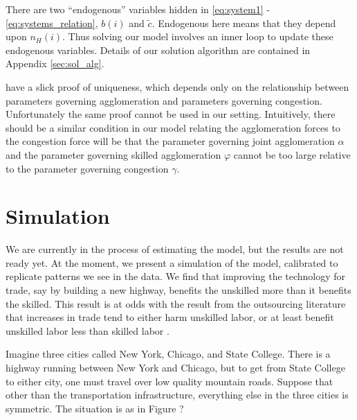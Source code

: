 \documentclass[12 pt]{article}
\begin{document}
There are two ``endogenous'' variables hidden in \eqref{eq:system1} - \eqref{eq:systems_relation}, $b(i)$ and $\tilde{c}$. Endogenous here means that they depend upon $n_H(i)$.  Thus solving our model involves an inner loop to update these endogenous variables.  Details of our solution algorithm are contained in Appendix \ref{sec:sol_alg}.

\citet{allen2014trade} have a slick proof of uniqueness, which depends only on the relationship between parameters governing agglomeration and parameters governing congestion.  Unfortunately the same proof cannot be used in our setting.  Intuitively, there should be a similar condition in our model relating the agglomeration forces to the congestion force will be that the parameter governing joint agglomeration $\alpha$ and the parameter governing skilled agglomeration $\varphi$ cannot be too large relative to the parameter governing congestion $\gamma$.  

\section{Simulation}

We are currently in the process of estimating the model, but the results are not ready yet.  At the moment, we present a simulation of the model, calibrated to replicate patterns we see in the data.  We find that improving the technology for trade, say by building a new highway, benefits the unskilled more than it benefits the skilled.  This result is at odds with the result from the outsourcing literature that increases in trade tend to either harm unskilled labor, or at least benefit unskilled labor less than skilled labor \citep{hummels2014wage}.

Imagine three cities called New York, Chicago, and State College.  There is a highway running between New York and Chicago, but to get from State College to either city, one must travel over low quality mountain roads.  Suppose that other than the transportation infrastructure, everything else in the three cities is symmetric.  The situation is as in Figure ? 
\end{document}
